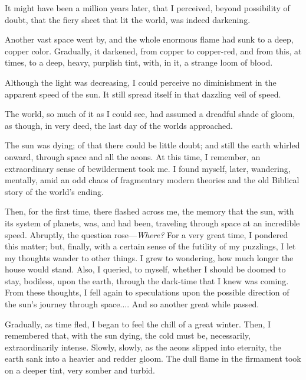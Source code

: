 
\clearpage
\label{ch:11}

\begin{ChapterStart}
\null\null
{}
\end{ChapterStart}

It might have been a million years later, that I perceived, beyond possibility of doubt, that the fiery sheet that lit the world, was indeed darkening.

Another vast space went by, and the whole enormous flame had sunk to a deep, copper color. Gradually, it darkened, from copper to copper-red, and from this, at times, to a deep, heavy, purplish tint, with, in it, a strange loom of blood.

Although the light was decreasing, I could perceive no diminishment in the apparent speed of the sun. It still spread itself in that dazzling veil of speed.

The world, so much of it as I could see, had assumed a dreadful shade of gloom, as though, in very deed, the last day of the worlds approached.

The sun was dying; of that there could be little doubt; and still the earth whirled onward, through space and all the aeons. At this time, I remember, an extraordinary sense of bewilderment took me. I found myself, later, wandering, mentally, amid an odd chaos of fragmentary modern theories and the old Biblical story of the world’s ending.

Then, for the first time, there flashed across me, the memory that the sun, with its system of planets, was, and had been, traveling through space at an incredible speed. Abruptly, the question rose---\textit{Where?} For a very great time, I pondered this matter; but, finally, with a certain sense of the futility of my puzzlings, I let my thoughts wander to other things. I grew to wondering, how much longer the house would stand. Also, I queried, to myself, whether I should be doomed to stay, bodiless, upon the earth, through the dark-time that I knew was coming. From these thoughts, I fell again to speculations upon the possible direction of the sun’s journey through space.... And so another great while passed.

Gradually, as time fled, I began to feel the chill of a great winter. Then, I remembered that, with the sun dying, the cold must be, necessarily, extraordinarily intense. Slowly, slowly, as the aeons slipped into eternity, the earth sank into a heavier and redder gloom. The dull flame in the firmament took on a deeper tint, very somber and turbid.

